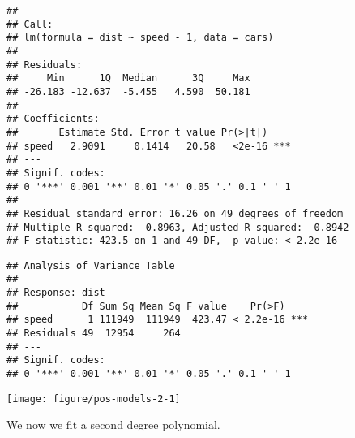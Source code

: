 \documentclass[paper=a4,headsepline,BCOR=12mm,twoside,open=right,%
titlepage,headings=small,fontsize=10pt,index=totoc,bibliography=totoc,%
captions=tableheading,captions=nooneline]{scrbook}\usepackage{knitr}
\begin{document}
\begin{knitrout}\footnotesize
{}\color{fgcolor}\begin{kframe}
\begin{alltt}
 \hlkwb{<-}  \hlopt{~}  \hlopt{-} \hlstd{,} 
  \hlstd{=} \hlstd{)}
\end{alltt}
\begin{verbatim}
## 
## Call:
## lm(formula = dist ~ speed - 1, data = cars)
## 
## Residuals:
##     Min      1Q  Median      3Q     Max 
## -26.183 -12.637  -5.455   4.590  50.181 
## 
## Coefficients:
##       Estimate Std. Error t value Pr(>|t|)    
## speed   2.9091     0.1414   20.58   <2e-16 ***
## ---
## Signif. codes:  
## 0 '***' 0.001 '**' 0.01 '*' 0.05 '.' 0.1 ' ' 1
## 
## Residual standard error: 16.26 on 49 degrees of freedom
## Multiple R-squared:  0.8963,	Adjusted R-squared:  0.8942 
## F-statistic: 423.5 on 1 and 49 DF,  p-value: < 2.2e-16
\end{verbatim}
\begin{alltt}
\end{alltt}
\begin{verbatim}
## Analysis of Variance Table
## 
## Response: dist
##           Df Sum Sq Mean Sq F value    Pr(>F)    
## speed      1 111949  111949  423.47 < 2.2e-16 ***
## Residuals 49  12954     264                      
## ---
## Signif. codes:  
## 0 '***' 0.001 '**' 0.01 '*' 0.05 '.' 0.1 ' ' 1
\end{verbatim}
\end{kframe}

{\centering \texttt{[image: figure/pos-models-2-1]} 

}



\end{knitrout}

We now we fit a second degree polynomial.
\end{document}

